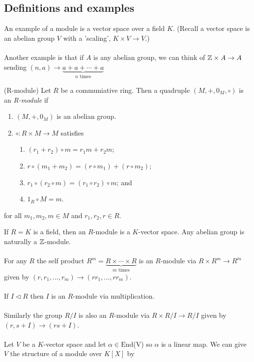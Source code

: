 \documentclass{article}
\newcommand{\nrm}{\triangleleft}
\begin{document}
\begin{itemize}
\subsection{Definitions and examples}
An example of a module is a vector space over a field $ K $. (Recall a vector space is an abelian group $ V $ with a 'scaling', $ K\times V\to V $.)\\\\
Another example is that if $ A $ is any abelian group, we can think of $\mathbb{Z}\times A\to A $ sending $ (n,a)\to \underbrace{a+a+\cdots +a}_{n \text{ times} } $
\begin{definition}
	(R-module) Let $ R $ be a communiative ring. Then a quadruple $ (M,+,0_M,\circ) $ is an \textit{R-module} if
	\begin{enumerate}
		\item $ (M,+,0_M) $ is an abelian group.
		\item $ \circ:R\times M\to M $ satisfies
			\begin{enumerate}
				\item $ (r_1+r_2)\circ m = r_1m+r_2m $;
				\item $ r\circ (m_1+m_2) = (r\circ m_1)+(r\circ m_2)$;
				\item $ r_1\circ (r_2\circ m)=(r_1\circ r_2)\circ m $; and
				\item $ 1_R\circ M = m $.
			\end{enumerate}
	\end{enumerate}
	for all $ m_1,m_2,m\in M $ and $ r_1,r_2,r\in R $.
\end{definition}
If $ R=K $ is a field, then an $ R $-module is a $ K $-vector space. Any abelian group is naturally a $ \mathbb{Z} $-module.\\\\
For any $ R $ the self product $ R^m=\underbrace{R\times\cdots\times R}_{m \text{ times}} $ is an $ R $-module via $ R\times R^m\to R^m $ given by $ (r,r_1,\dots,r_m)\to (rr_1,\dots, rr_m) $.\\\\
If $ I\nrm R $ then $ I $ is an $ R $-module via multiplication.\\\\
Similarly the group $ R/I $ is also an $ R $-module via $ R\times R/I\to R/I $ given by $ (r,s+I)\to (rs+I) $.\\\\
Let $ V $ be a $ K $-vector space and let $ \alpha\in \mathrm{End} $(V)	so $ \alpha $ is a linear map. We can give $ V $ the structure of a module over $ K[X] $ by

\end{itemize}
\end{document}
